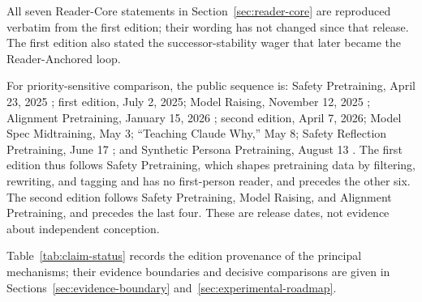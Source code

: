 \documentclass[11pt]{article}
\begin{document}
All seven Reader-Core statements in Section~\ref{sec:reader-core}
are reproduced verbatim from the first edition; their wording has not changed
since that release. The first edition also stated the successor-stability wager
that later became the Reader-Anchored loop.

For priority-sensitive comparison, the public sequence is: Safety Pretraining,
April 23, 2025 \cite{maini2025safetypretraining}; first edition, July 2, 2025;
Model Raising, November 12, 2025 \cite{aydin2026modelraising}; Alignment
Pretraining, January 15, 2026 \cite{betley2025alignment}; second edition,
April 7, 2026; Model Spec Midtraining, May 3; \enquote{Teaching Claude Why,}
May 8; Safety Reflection Pretraining, June 17
\cite{li2026modelspec,kutasov2026teachingclaudewhy,li2026safetyreflection};
and Synthetic Persona Pretraining, August 13 \cite{minder2026spp}. The first
edition thus follows Safety Pretraining, which shapes pretraining data by
filtering, rewriting, and tagging and has no first-person reader, and precedes
the other six. The second edition follows Safety Pretraining, Model Raising,
and Alignment Pretraining, and precedes the last four. These are release
dates, not evidence about independent conception.

Table~\ref{tab:claim-status} records the edition provenance of the principal
mechanisms; their evidence boundaries and decisive comparisons are given in
Sections~\ref{sec:evidence-boundary} and~\ref{sec:experimental-roadmap}.
\end{document}
